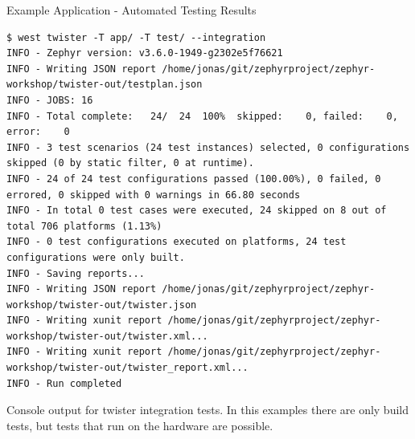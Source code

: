 \documentclass[10pt, aspectratio=169]{beamer}
\begin{document}
\begin{frame}[fragile]{Example Application - Automated Testing Results}
  \begin{listing}[H]
    \begin{verbatim}
$ west twister -T app/ -T test/ --integration
INFO - Zephyr version: v3.6.0-1949-g2302e5f76621
INFO - Writing JSON report /home/jonas/git/zephyrproject/zephyr-workshop/twister-out/testplan.json
INFO - JOBS: 16
INFO - Total complete:   24/  24  100%  skipped:    0, failed:    0, error:    0
INFO - 3 test scenarios (24 test instances) selected, 0 configurations skipped (0 by static filter, 0 at runtime).
INFO - 24 of 24 test configurations passed (100.00%), 0 failed, 0 errored, 0 skipped with 0 warnings in 66.80 seconds
INFO - In total 0 test cases were executed, 24 skipped on 8 out of total 706 platforms (1.13%)
INFO - 0 test configurations executed on platforms, 24 test configurations were only built.
INFO - Saving reports...
INFO - Writing JSON report /home/jonas/git/zephyrproject/zephyr-workshop/twister-out/twister.json
INFO - Writing xunit report /home/jonas/git/zephyrproject/zephyr-workshop/twister-out/twister.xml...
INFO - Writing xunit report /home/jonas/git/zephyrproject/zephyr-workshop/twister-out/twister_report.xml...
INFO - Run completed
    \end{verbatim}
    \caption{\footnotesize{Console output for twister integration tests. In this examples there are only build tests, but tests that run on the hardware are possible.}}
  \end{listing}
\end{frame}
\end{document}
